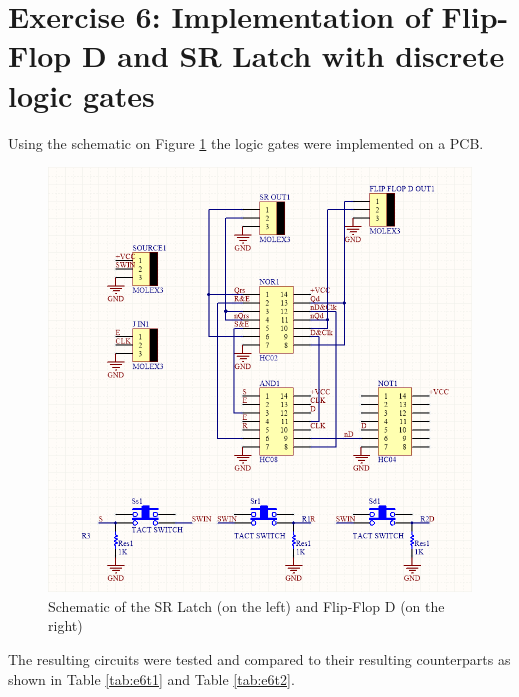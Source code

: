 
        \section{\color{olive}Exercise 6: Implementation of Flip-Flop D and SR Latch with discrete logic gates}
        Using the schematic on Figure \ref{fig:Schem} the logic gates were implemented on a PCB.
        
        \begin{figure}[h!]
            \begin{center}
                \includegraphics[width=\linewidth]{../Exercise6/latex/e6Schem.png}
                \caption{\color{cyan}Schematic of the  SR Latch (on the left) and Flip-Flop D (on the right)}
            \end{center}
            \label{fig:Schem}
        \end{figure}

        The resulting circuits were tested and compared to their resulting counterparts as shown in
        Table \ref{tab:e6t1} and Table \ref{tab:e6t2}.

